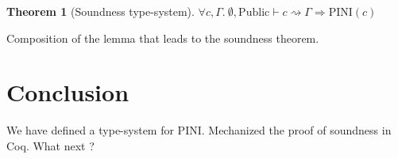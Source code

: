 \documentclass[10pt]{article}
\newcommand{\ctx}{\Gamma}
\newcommand{\typing}[4]{ #1, #2 \vdash #3 \rightsquigarrow #4}
\newcommand{\pini}[1]{\mathrm{PINI}(#1)}
\newtheorem{theorem}{Theorem}
\begin{document}
\begin{theorem}[Soundness type-system]
  \( \forall c, \ctx.\
  \typing{\emptyset}{\mathrm{Public}}{c}{\ctx}
  \Rightarrow \pini{c}
  \)
\end{theorem}

Composition of the lemma that leads to the soundness theorem.

\section{Conclusion}%
\label{sec:conclusion}

We have defined a type-system for PINI. Mechanized the proof of soundness in Coq.
What next ?




\end{document}
